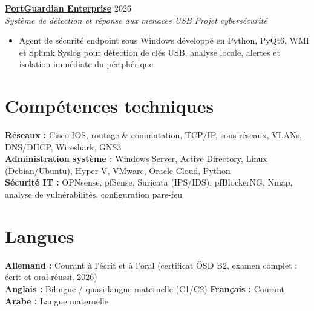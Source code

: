 \documentclass[10pt,a4paper]{article}
\newcommand{\cvheadinglink}[5]{
  \textbf{\href{#5}{#1}} \hfill #2 \\[0.08em]
  \textit{#3} \hfill \textit{#4}
}
\begin{document}
\cvheadinglink{PortGuardian Enterprise}{2026}{Système de détection et réponse aux menaces USB}{Projet cybersécurité}{https://grydsh.dev/fr/portguardian.html}
\begin{itemize}
  \item Agent de sécurité endpoint sous Windows développé en Python, PyQt6, WMI et Splunk Syslog pour détection de clés USB, analyse locale, alertes et isolation immédiate du périphérique.
\end{itemize}

\section*{Compétences techniques}
\textbf{Réseaux :} Cisco IOS, routage \& commutation, TCP/IP, sous-réseaux, VLANs, DNS/DHCP, Wireshark, GNS3 \\
\textbf{Administration système :} Windows Server, Active Directory, Linux (Debian/Ubuntu), Hyper-V, VMware, Oracle Cloud, Python \\
\textbf{Sécurité IT :} OPNsense, pfSense, Suricata (IPS/IDS), pfBlockerNG, Nmap, analyse de vulnérabilités, configuration pare-feu

\section*{Langues}
\textbf{Allemand :} Courant à l'écrit et à l'oral (certificat ÖSD B2, examen complet : écrit et oral réussi, 2026) \\
\textbf{Anglais :} Bilingue / quasi-langue maternelle (C1/C2) \textbar{} \textbf{Français :} Courant \textbar{} \textbf{Arabe :} Langue maternelle
\end{document}
